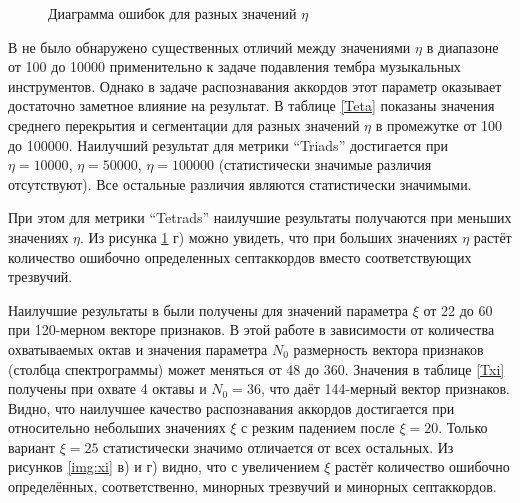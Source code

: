 \begin{figure}[h]
  \begin{minipage}[h]{0.49\linewidth}
  \end{minipage}
  \hfill
  \begin{minipage}[h]{0.49\linewidth}
  \end{minipage}
  \hfill
  \begin{minipage}[h]{0.49\linewidth}
  \end{minipage}
  \hfill
  \begin{minipage}[h]{0.49\linewidth}
  \end{minipage}
  \caption{Диаграмма ошибок для разных значений $\eta$}
  \label{img:logEta}
\end{figure}

В \cite{Mueller2009} не было обнаружено существенных отличий между значениями
$\eta$ в диапазоне от 100 до 10000 применительно к задаче подавления тембра
музыкальных инструментов. Однако в задаче распознавания аккордов этот параметр
оказывает достаточно заметное влияние на результат. В таблице \ref{Teta}
показаны значения среднего перекрытия и сегментации для разных значений $\eta$
в промежутке от 100 до 100000. Наилучший результат для метрики ``Triads''
достигается при $\eta=10000$, $\eta=50000$, $\eta=100000$ (статистически
значимые различия отсутствуют). Все остальные различия являются статистически
значимыми.

При этом для метрики ``Tetrads'' наилучшие результаты получаются при меньших
значениях $\eta$. Из рисунка \ref{img:logEta} г) можно увидеть, что при больших
значениях $\eta$ растёт количество ошибочно определенных септаккордов вместо
соответствующих трезвучий.

Наилучшие результаты в \cite{Mueller2009} были получены для значений параметра
$\xi$ от 22 до 60 при 120-мерном векторе признаков. В этой работе в зависимости
от количества охватываемых октав и значения параметра $N_0$ размерность вектора
признаков (столбца спектрограммы) может меняться от 48 до 360. Значения в
таблице \ref{Txi} получены при охвате 4 октавы и $N_0=36$, что даёт 144-мерный
вектор признаков. Видно, что наилучшее качество распознавания аккордов
достигается при относительно небольших значениях $\xi$ с резким падением после
$\xi=20$. Только вариант $\xi=25$ статистически значимо отличается от всех
остальных. Из рисунков \ref{img:xi} в) и г) видно, что с увеличением $\xi$
растёт количество ошибочно определённых, соответственно, минорных трезвучий и
минорных септаккордов.

